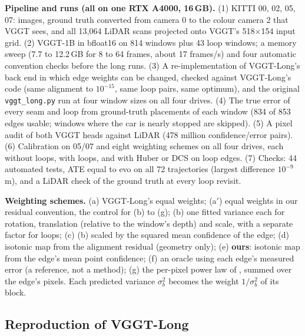 \documentclass[11pt, a4paper]{article}
\begin{document}
\textbf{Pipeline and runs (all on one RTX A4000, 16\,GB).} (1) KITTI 00, 02, 05, 07: images, ground truth converted from
camera 0 to the colour camera 2 that VGGT sees, and all 13{,}064 LiDAR scans projected onto VGGT's 518$\times$154 input
grid. (2) VGGT-1B in bfloat16 on 814 windows plus 43 loop windows; a memory sweep (7.7 to 12.2\,GB for 8 to 64 frames,
about 17 frames/s) and four automatic convention checks before the long runs. (3) A re-implementation of VGGT-Long's
back end in which edge weights can be changed, checked against VGGT-Long's code (same alignment to $10^{-15}$, same loop
pairs, same optimum), and the original \texttt{vggt\_long.py} run at four window sizes on all four drives. (4) The true
error of every seam and loop from ground-truth placements of each window (834 of 853 edges usable; windows where the car
is nearly stopped are skipped). (5) A pixel audit of both VGGT heads against LiDAR (478 million confidence/error pairs).
(6) Calibration on 05/07 and eight weighting schemes on all four drives, each without loops, with loops, and with Huber
or DCS on loop edges. (7) Checks: 44 automated tests, ATE equal to evo on all 72 trajectories (largest difference
$10^{-9}$\,m), and a LiDAR check of the ground truth at every loop revisit.

\textbf{Weighting schemes.} (a) VGGT-Long's equal weights; (a$'$) equal weights in our residual convention, the control
for (b) to (g); (b) one fitted variance each for rotation, translation (relative to the window's depth) and scale, with a
separate factor for loops; (c) (b) scaled by the squared mean confidence of the edge; (d) isotonic map from the
alignment residual (geometry only); (e) \textbf{ours}: isotonic map from the edge's mean point confidence; (f) an oracle
using each edge's measured error (a reference, not a method); (g) the per-pixel power law of \cite{dengaudit}, summed over
the edge's pixels. Each predicted variance $\sigma_b^2$ becomes the weight $1/\sigma_b^2$ of its block.

\subsection{Reproduction of VGGT-Long}
\end{document}
